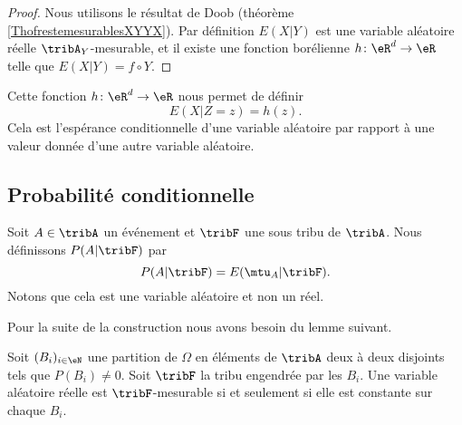 \begin{proof}
    Nous utilisons le résultat de Doob (théorème \ref{ThofrestemesurablesXYYX}). Par définition \( E(X|Y)\) est une variable aléatoire réelle \( \tribA_Y\)-mesurable, et il existe une fonction borélienne \( h\colon \eR^d\to \eR\) telle que \( E(X|Y)=f\circ Y\).
\end{proof}

Cette fonction \( h\colon \eR^d\to \eR\) nous permet de définir
\begin{equation}
    E(X|Z=z)=h(z).
\end{equation}
Cela est l'espérance conditionnelle d'une variable aléatoire par rapport à une valeur donnée d'une autre variable aléatoire.

\subsection{Probabilité conditionnelle}

Soit \( A\in\tribA\) un événement et \( \tribF\) une sous tribu de \( \tribA\). Nous définissons \( P(A|\tribF)\) par
\begin{equation}
    P(A|\tribF)=E(\mtu_{A}|\tribF).
\end{equation}
Notons que cela est une variable aléatoire et non un réel.

Pour la suite de la construction nous avons besoin du lemme suivant.
\begin{lemma}
    Soit \( (B_i)_{i\in\eN}\) une partition de \( \Omega\) en éléments de \( \tribA\) deux à deux disjoints tels que \( P(B_i)\neq 0\). Soit \( \tribF\) la tribu engendrée par les \( B_i\). Une variable aléatoire réelle est \( \tribF\)-mesurable si et seulement si elle est constante sur chaque \( B_i\).
\end{lemma}

